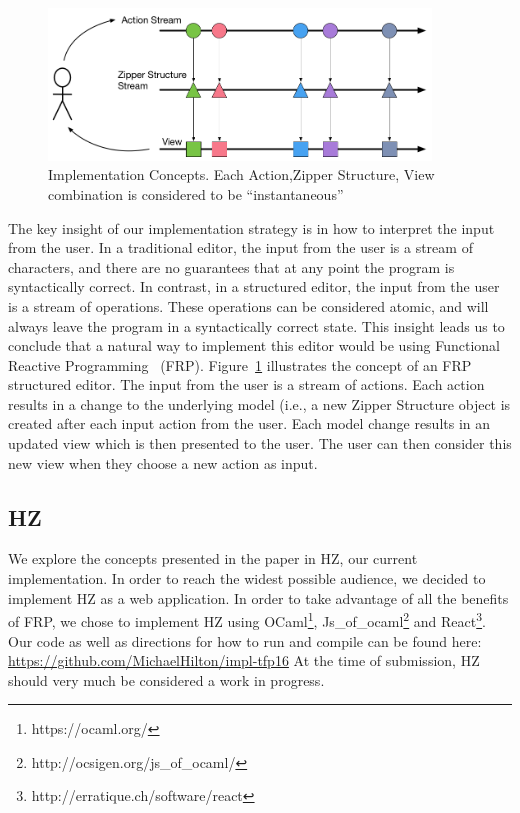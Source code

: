 \documentclass{llncs}
\begin{document}
\begin{figure}
\centering
\includegraphics[width=4in]{Implementation_Diagram}
\caption{Implementation Concepts. Each Action,Zipper Structure, View combination is considered to be ``instantaneous''}
\label{fig:FRP}
\end{figure}

The key insight of our implementation strategy is in how to interpret the input from the user.
In a traditional editor, the input from the user is a stream of characters, and there are no guarantees that at any point the program is syntactically correct.
In contrast, in a structured editor, the input from the user is a stream of operations.  These operations can be considered atomic, and will always leave the program in a syntactically correct state.
This insight leads us to conclude that a natural way to implement this editor would be using Functional Reactive Programming~\cite{Wan:2000:FRP:349299.349331} (FRP).
Figure~\ref{fig:FRP} illustrates the concept of an FRP structured editor.
The input from the user is a stream of actions.  Each action results in a change to the underlying model (i.e., a new Zipper Structure object is created after each input action from the user.
Each model change results in an updated view which is then presented to the user.  The user can then consider this new view when they choose a new action as input.

\subsection{HZ}
We explore the concepts presented in the paper in HZ, our current implementation.
In order to reach the widest possible audience, we decided to implement HZ as a web application.
In order to take advantage of all the benefits of FRP, we chose to implement HZ using OCaml\footnote{https://ocaml.org/}, Js\_of\_ocaml\footnote{http://ocsigen.org/js\_of\_ocaml/} and React\footnote{http://erratique.ch/software/react}.
Our code as well as directions for how to run and compile can be found here: \url{https://github.com/MichaelHilton/impl-tfp16}
At the time of submission, HZ should very much be considered a work in progress.
\end{document}
